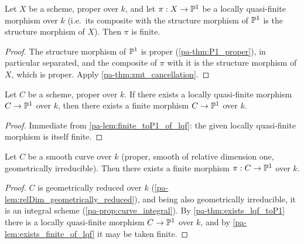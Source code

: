 \begin{lemma}
  \label{pa-lem:finite_toP1_of_lqf}
  \leanok

  Let \(X\) be a scheme, proper over \(k\), and let \(\pi : X \to \mathbb{P}^1\) be a locally
  quasi-finite morphism over \(k\) (i.e.\ its composite with the structure morphism of
  \(\mathbb{P}^1\) is the structure morphism of \(X\)). Then \(\pi\) is finite.
\end{lemma}
\begin{proof}
  \leanok
  The structure morphism of \(\mathbb{P}^1\) is proper (\ref{pa-thm:P1_proper}), in particular
  separated, and the composite of \(\pi\) with it is the structure morphism of \(X\), which
  is proper. Apply \ref{pa-thm:zmt_cancellation}.
\end{proof}

\begin{lemma}
  \label{pa-lem:exists_finite_of_lqf}
  \leanok

  Let \(C\) be a scheme, proper over \(k\). If there exists a locally quasi-finite morphism
  \(C \to \mathbb{P}^1\) over \(k\), then there exists a finite morphism \(C \to \mathbb{P}^1\) over \(k\).
\end{lemma}
\begin{proof}
  \leanok
  Immediate from \ref{pa-lem:finite_toP1_of_lqf}: the given locally quasi-finite morphism is
  itself finite.
\end{proof}

\begin{theorem}
  \label{pa-thm:exists_finite_toP1}
  \leanok

  Let \(C\) be a smooth curve over \(k\) (proper, smooth of relative dimension one,
  geometrically irreducible). Then there exists a finite morphism \(\pi : C \to \mathbb{P}^1\) over
  \(k\).
\end{theorem}
\begin{proof}
  \leanok
  \(C\) is geometrically reduced over \(k\) (\ref{pa-lem:relDim_geometrically_reduced}), and
  being also geometrically irreducible, it is an integral scheme
  (\ref{pa-prop:curve_integral}). By \ref{pa-thm:exists_lqf_toP1} there is a locally quasi-finite
  morphism \(C \to \mathbb{P}^1\) over \(k\), and by \ref{pa-lem:exists_finite_of_lqf} it may be
  taken finite.
\end{proof}

